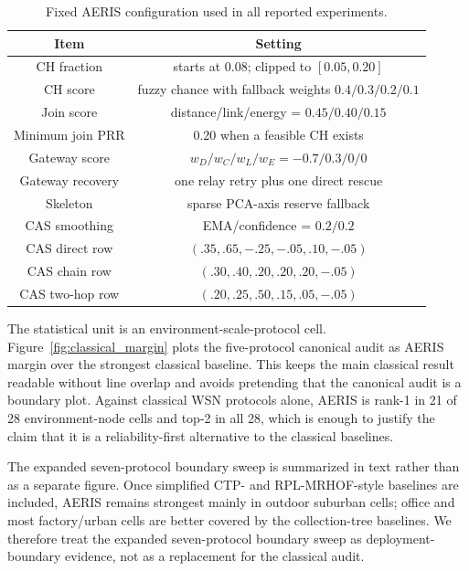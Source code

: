 \documentclass[conference]{IEEEtran}
\begin{document}
\begin{table}[t]
\caption{Fixed AERIS configuration used in all reported experiments.}
\label{tbl:aeris_params}
\centering
\scriptsize
\setlength{\tabcolsep}{2pt}
\begin{tabular*}{\columnwidth}{@{\extracolsep{\fill}}cc@{}}
\toprule
Item & Setting \\
\midrule
CH fraction & starts at 0.08; clipped to $[0.05,0.20]$ \\
CH score & fuzzy chance with fallback weights $0.4/0.3/0.2/0.1$ \\
Join score & distance/link/energy = $0.45/0.40/0.15$ \\
Minimum join PRR & 0.20 when a feasible CH exists \\
Gateway score & $w_D/w_C/w_L/w_E=-0.7/0.3/0/0$ \\
Gateway recovery & one relay retry plus one direct rescue \\
Skeleton & sparse PCA-axis reserve fallback \\
CAS smoothing & EMA/confidence = $0.2/0.2$ \\
CAS direct row & $(.35,.65,-.25,-.05,.10,-.05)$ \\
CAS chain row & $(.30,.40,.20,.20,.20,-.05)$ \\
CAS two-hop row & $(.20,.25,.50,.15,.05,-.05)$ \\
\bottomrule
\end{tabular*}
\end{table}

The statistical unit is an environment-scale-protocol cell. Figure~\ref{fig:classical_margin} plots the five-protocol canonical audit as AERIS margin over the strongest classical baseline. This keeps the main classical result readable without line overlap and avoids pretending that the canonical audit is a boundary plot. Against classical WSN protocols alone, AERIS is rank-1 in 21 of 28 environment-node cells and top-2 in all 28, which is enough to justify the claim that it is a reliability-first alternative to the classical baselines.

The expanded seven-protocol boundary sweep is summarized in text rather than as a separate figure. Once simplified CTP- and RPL-MRHOF-style baselines are included, AERIS remains strongest mainly in outdoor suburban cells; office and most factory/urban cells are better covered by the collection-tree baselines. We therefore treat the expanded seven-protocol boundary sweep as deployment-boundary evidence, not as a replacement for the classical audit.
\end{document}
